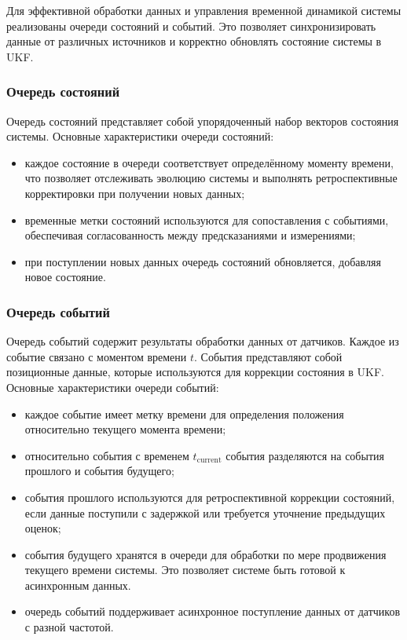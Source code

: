 Для эффективной обработки данных и управления временной динамикой системы реализованы очереди состояний и событий.
Это позволяет синхронизировать данные от различных источников и корректно обновлять состояние системы в UKF.

\subsubsection{Очередь состояний}
\label{subsec:state_queue}

Очередь состояний представляет собой упорядоченный набор векторов состояния системы.
Основные характеристики очереди состояний:
\begin{itemize}
    \item каждое состояние в очереди соответствует определённому моменту времени, что позволяет отслеживать эволюцию системы и выполнять ретроспективные корректировки при получении новых данных;
    \item временные метки состояний используются для сопоставления с событиями, обеспечивая согласованность между предсказаниями и измерениями;
    \item при поступлении новых данных очередь состояний обновляется, добавляя новое состояние.
\end{itemize}

\subsubsection{Очередь событий}
\label{subsec:event_queue}

Очередь событий содержит результаты обработки данных от датчиков. Каждое из событие связано с моментом времени $t$.
События представляют собой позиционные данные, которые используются для коррекции состояния в UKF.
Основные характеристики очереди событий:
\begin{itemize}
    \item каждое событие имеет метку времени для определения положения относительно текущего момента времени;
    \item относительно события с временем $t_{\text{current}}$ события разделяются на события прошлого и события будущего;
    \item события прошлого используются для ретроспективной коррекции состояний, если данные поступили с задержкой или требуется уточнение предыдущих оценок;
    \item события будущего хранятся в очереди для обработки по мере продвижения текущего времени системы. Это позволяет системе быть готовой к асинхронным данных.
    \item очередь событий поддерживает асинхронное поступление данных от датчиков с разной частотой. 
\end{itemize}

